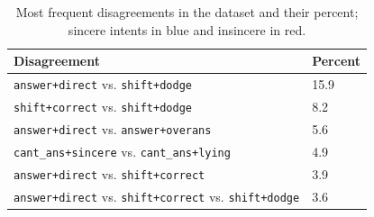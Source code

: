 \begin{table}
\centering
\small
\begin{tabular}{>{\raggedright\arraybackslash}ll}
\toprule
Disagreement  &Percent\\ 
\midrule
\texttt{answer+{\color{blue}direct}} vs. \texttt{shift+{\color{red}dodge}} &15.9\\
\texttt{shift+{\color{blue}correct}} vs. \texttt{shift+{\color{red}dodge}} &\phantom{0}8.2 \\
\texttt{answer+{\color{blue}direct}} vs. \texttt{answer+{\color{red}overans}} &\phantom{0}5.6 \\
\texttt{cant\_ans+{\color{blue}sincere}} vs. \texttt{cant\_ans+{\color{red}lying}} &\phantom{0}4.9 \\
\texttt{answer+{\color{blue}direct}} vs. \texttt{shift+{\color{blue}correct}} &\phantom{0}3.9 \\
\texttt{answer+{\color{blue}direct}} vs. \texttt{shift+{\color{blue}correct}} vs. \texttt{shift+{\color{red}dodge}}&\phantom{0}3.6\\
\bottomrule
\end{tabular}
\vspace{-.3em}
\caption{Most frequent disagreements in the dataset and their percent; sincere intents in {\color{blue}blue} and insincere in {\color{red}red}.}
\label{tab:subj_label_set_disagree}
\end{table}



